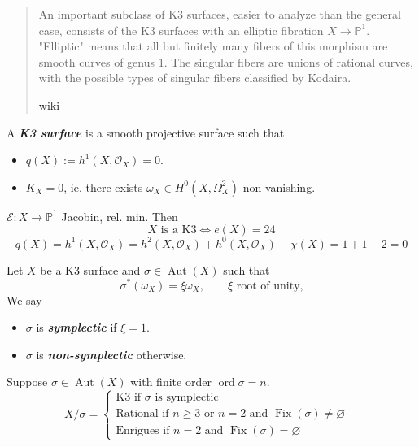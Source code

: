 \begin{quotation}
	An important subclass of K3 surfaces, easier to analyze than the general case, consists of the K3 surfaces with an elliptic fibration $X\to \mathbb{P}^1$. "Elliptic" means that all but finitely many fibers of this morphism are smooth curves of genus 1. The singular fibers are unions of rational curves, with the possible types of singular fibers classified by Kodaira.
	
	\hfill \href{https://en.wikipedia.org/wiki/K3_surface#Elliptic_K3_surfaces}{wiki}
\end{quotation}


\begin{defn}
	A \textit{\textbf{K3 surface}} is a smooth projective surface such that
	\begin{itemize}
	\item $q(X):=h^1(X,\mathcal{O}_X)=0$.

	\item $K_X=0$, ie. there exists  $\omega_X\in H^{0}(X,\Omega^2_X)$ non-vanishing.
	\end{itemize}
\end{defn}

\begin{prop}
	$\mathcal{E}:X\to \mathbb{P}^1$ Jacobin, rel. min. Then
	\[X \text{ is a K3}\iff e(X)=24 \]
	\[q(X)= h^{1}(X,\mathcal{O}_X)=h^{2}(X,\mathcal{O}_X)+h^{0}(X,\mathcal{O}_X)-\chi(X)=1+1-2=0\]
\end{prop}

\begin{defn}
Let $X$ be a K3 surface and $\sigma\in\operatorname{Aut}(X)$ such that
\[\sigma ^*(\omega_X)=\xi \omega_X,\qquad \xi \text{ root of unity,} \]
We say 
\begin{itemize}
\item $\sigma$ is \textit{\textbf{symplectic}} if $\xi =1$.
\item $\sigma$ is \textit{\textbf{non-symplectic}} otherwise.
\end{itemize}

Suppose $\sigma\in\operatorname{Aut}(X)$ with finite order $\operatorname{ord}\sigma=n$.
\[X/\sigma=\begin{cases}
	\text{K3 if $\sigma$ is symplectic}\\
	\text{Rational if $n\geq 3$ or $n=2$ and $\operatorname{Fix}(\sigma)\neq \varnothing $}\\
	\text{Enrigues if $n=2$ and $\operatorname{Fix}(\sigma)=\varnothing $} 
	\qquad &
\end{cases}\]
\end{defn}

